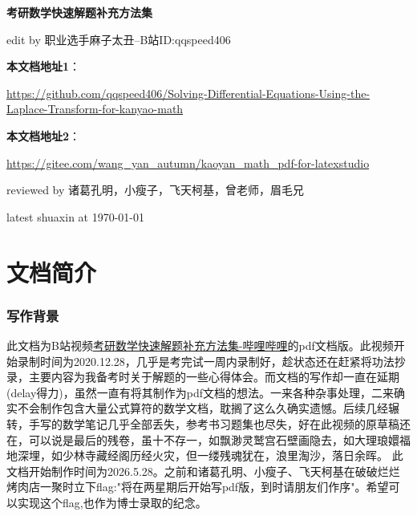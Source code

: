 \documentclass[12pt]{report}
\begin{document}

\begin{titlepage} %
	
	
	\centering %
	
	\vspace*{3cm} 
	{\Huge\bfseries 考研数学快速解题补充方法集} 
	
	\vspace{1.5cm} 
	{\Large edit by 职业选手麻子太丑--B站ID:qqspeed406}
	
	\vspace{1cm} 
	
	\textbf{本文档地址1}：\parbox{10cm}{\href{https://github.com/qqspeed406/Solving-Differential-Equations-Using-the-Laplace-Transform-for-kanyao-math}{https://github.com/qqspeed406/Solving-Differential-Equations-Using-the-Laplace-Transform-for-kanyao-math}}
	
	\vspace{1cm} 
	
	\textbf{本文档地址2}：\parbox{10cm}{\href{https://gitee.com/wang_yan_autumn/kaoyan_math_pdf-for-latexstudio}{https://gitee.com/wang\_yan\_autumn/kaoyan\_math\_pdf-for-latexstudio}}

	
	\vspace{1cm}
	
	{\large reviewed by 诸葛孔明，小瘦子，飞天柯基，曾老师，眉毛兄}

    \vspace{0.5cm}

	{ latest shuaxin at \today}
	
	
	
	
	
\end{titlepage} %


   \chapter*{文档简介}
   \thispagestyle{empty} %
   \subsection*{\centering 写作背景}
   此文档为B站视频\href{https://b23.tv/R8F4RW5}{考研数学快速解题补充方法集-哔哩哔哩}的pdf文档版。此视频开始录制时间为2020.12.28，几乎是考完试一周内录制好，趁状态还在赶紧将功法抄录，主要内容为我备考时关于解题的一些心得体会。而文档的写作却一直在延期(delay得力)，虽然一直有将其制作为pdf文档的想法。一来各种杂事处理，二来确实不会制作包含大量公式算符的数学文档，耽搁了这么久确实遗憾。后续几经辗转，手写的数学笔记几乎全部丢失，参考书习题集也尽失，好在此视频的原草稿还在，可以说是最后的残卷，虽十不存一，如飘渺灵鹫宫石壁画隐去，如大理琅嬛福地深埋，如少林寺藏经阁历经火灾，但一缕残魂犹在，浪里淘沙，落日余晖。
   此文档开始制作时间为2026.5.28。之前和诸葛孔明、小瘦子、飞天柯基在破破烂烂烤肉店一聚时立下flag:"将在两星期后开始写pdf版，到时请朋友们作序"。希望可以实现这个flag,也作为博士录取的纪念。
   
\end{document}
